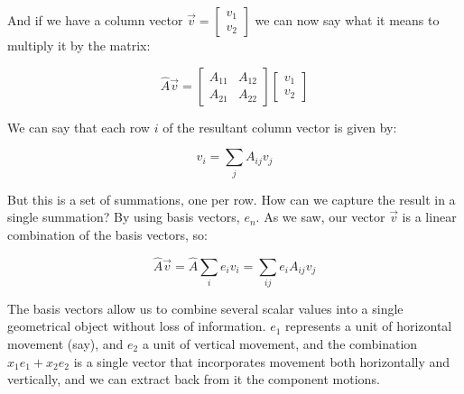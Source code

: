 And if we have a column vector $\vec{v} = \begin{bmatrix}v_1 \\ v_2\end{bmatrix}$ we can now say what it means to multiply it by the matrix:

$$
\hat{A}\vec{v} =
\begin{bmatrix}A_{11} & A_{12} \\ A_{21} & A_{22}\end{bmatrix}
\begin{bmatrix}v_1 \\ v_2\end{bmatrix}
$$

We can say that each row $i$ of the resultant column vector is given by:

$$
v_i = \sum_j{A_{ij} v_j}
$$

But this is a set of summations, one per row. How can we capture the result in a single summation? By using basis vectors, $e_n$. As we saw, our vector $\vec{v}$ is a linear combination of the basis vectors, so:

$$
\hat{A}\vec{v} =
\hat{A}\sum_{i}e_i v_i =
\sum_{ij}e_i{A_{ij}v_j}
$$

The basis vectors allow us to combine several scalar values into a single geometrical object without loss of information. $e_1$ represents a unit of horizontal movement (say), and $e_2$ a unit of vertical movement, and the combination $x_1e_1 + x_2e_2$ is a single vector that incorporates movement both horizontally and vertically, and we can extract back from it the component motions.
